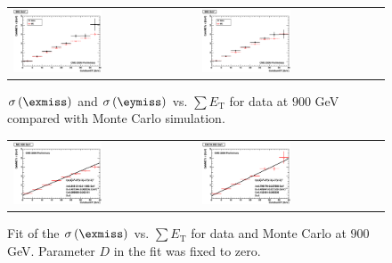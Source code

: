 \begin{figure}[h!]
 \centering
 \begin{tabular}{ll}
  \includegraphics[width=0.5\textwidth]{plots_DataVsMC_MB_900GeV/h_metxsigma_sumet_900.eps} &
  \includegraphics[width=0.5\textwidth]{plots_DataVsMC_MB_900GeV/h_metysigma_sumet_900.eps} \\
 \end{tabular}
 \caption{\small $\sigma\left(\exmiss\right)$ and $\sigma\left(\eymiss\right)$ vs. $\sum E_\text{T}$ for data at $900$ GeV
          compared with Monte Carlo simulation.\label{fig:MExySigma_vs_SumET_900}}
\end{figure}

\begin{figure}[h!]
 \centering
 \begin{tabular}{ll}
  \includegraphics[width=0.5\textwidth]{plots_DataVsMC_MB_900GeV/final_metxsigma_sumet_MC_900.eps} &
  \includegraphics[width=0.5\textwidth]{plots_DataVsMC_MB_900GeV/final_metxsigma_sumet_DATA_900.eps} \\
 \end{tabular}
 \caption{\small Fit of the $\sigma\left(\exmiss\right)$ vs. $\sum E_\text{T}$ for data and Monte Carlo at $900$ GeV. Parameter $D$ in the fit was fixed
          to zero.\label{fig:MExSigma_vs_SumET_900_fit}}
\end{figure}

